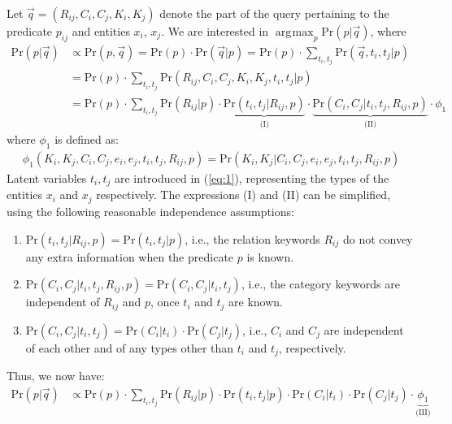 \documentclass[a4paper, twoside, 12pt]{report}
\DeclareMathOperator*{\argmax}{arg\!\max}
\begin{document}
Let $\vec{q} = (R_{ij}, C_i, C_j, K_i, K_j)$ denote the part of the query pertaining to the predicate $p_{ij}$ and entities $x_i$, $x_j$. We are interested in $\argmax_{p}$Pr$(p|\vec{q})$, where
\begin{align}\label{eq:1}
\text{Pr}(p|\vec{q}) &\propto \text{Pr}(p, \vec{q}) = \text{Pr}(p)\cdot \text{Pr}(\vec{q}|p) = \text{Pr}(p)\cdot \sum_{t_{i}, t_{j}} \text{Pr}(\vec{q}, t_i, t_j | p) \\
&= \text{Pr}(p)\cdot \sum_{t_{i}, t_{j}} \text{Pr}(R_{ij}, C_i, C_j, K_i, K_j, t_i, t_j| p) \\
&= \text{Pr}(p)\cdot \sum_{t_{i}, t_{j}} \text{Pr}(R_{ij}|p)\cdot\underbrace{\text{Pr}(t_i,t_j|R_{ij},p)}_\text{(I)}\cdot\underbrace{\text{Pr}(C_i,C_j|t_i,t_j,R_{ij},p)}_\text{(II)}\cdot \phi_1 \label{eq:omphi1}
\end{align}
where $\phi_1$ is defined as:
\begin{align}
\phi_1(K_i,K_j,C_i,C_j,e_i,e_j,t_i,t_j,R_{ij},p) = \text{Pr}(K_i,K_j|C_i,C_j,e_i,e_j,t_i,t_j,R_{ij},p) \label{eq:phi1}
\end{align}
Latent variables $t_i, t_j$ are introduced in (\ref{eq:1}), representing the types of the entities $x_i$ and $x_j$ respectively. The expressions (I) and (II) can be simplified, using the following reasonable independence assumptions:

\begin{enumerate}
\item $\text{Pr}(t_i,t_j|R_{ij},p) = \text{Pr}(t_i,t_j|p)$, i.e., the relation keywords $R_{ij}$ do not convey any extra information when the predicate $p$ is known.

\item $\text{Pr}(C_i,C_j|t_i,t_j,R_{ij},p) = \text{Pr}(C_i,C_j|t_i,t_j)$, i.e., the category keywords are independent of $R_{ij}$ and $p$, once $t_i$ and $t_j$ are known.

\item $\text{Pr}(C_i,C_j|t_i,t_j) = \text{Pr}(C_i|t_i) \cdot \text{Pr}(C_j|t_j)$, i.e., $C_i$ and $C_j$ are independent of each other and of any types other than $t_i$ and $t_j$, respectively.
\end{enumerate}

Thus, we now have:
\begin{align}
\text{Pr}(p|\vec{q}) &\propto \text{Pr}(p)\cdot \sum_{t_{i}, t_{j}} \text{Pr}(R_{ij}|p)\cdot \text{Pr}(t_i,t_j|p) \cdot \text{Pr}(C_i|t_i) \cdot \text{Pr}(C_j|t_j) \cdot \underbrace{\phi_1}_\text{(III)} \label{eq:main2}
\end{align}
\end{document}

